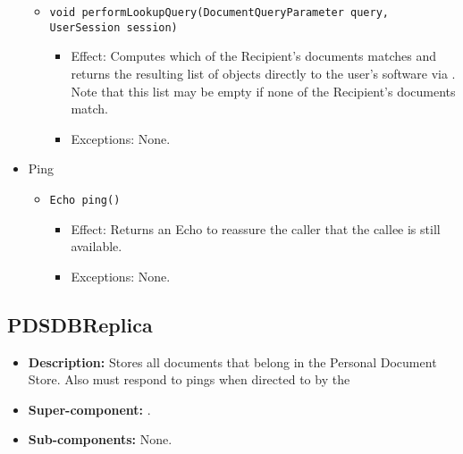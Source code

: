 \begin{itemize}
\begin{itemize}
		\item \texttt{void performLookupQuery(DocumentQueryParameter query, UserSession session)}
		\begin{itemize}
			\item Effect: Computes which of the Recipient's documents matches  and returns the resulting list of  objects directly to the user's software via . Note that this list may be empty if none of the Recipient's documents match.
			\item Exceptions: None.
		\end{itemize}
	\end{itemize}

	\item Ping
	\begin{itemize}
		\item \texttt{Echo ping()}
		\begin{itemize}
			\item Effect: Returns an Echo to reassure the caller that the callee is still available.
			\item Exceptions: None.
		\end{itemize}
	\end{itemize}
\end{itemize}

\subsection{PDSDBReplica}
\begin{itemize}
    \item \textbf{Description:} Stores all documents that belong in the Personal Document Store. Also must respond to pings when directed to by the 
    \item \textbf{Super-component:} .
    \item \textbf{Sub-components:} None.
\end{itemize}

